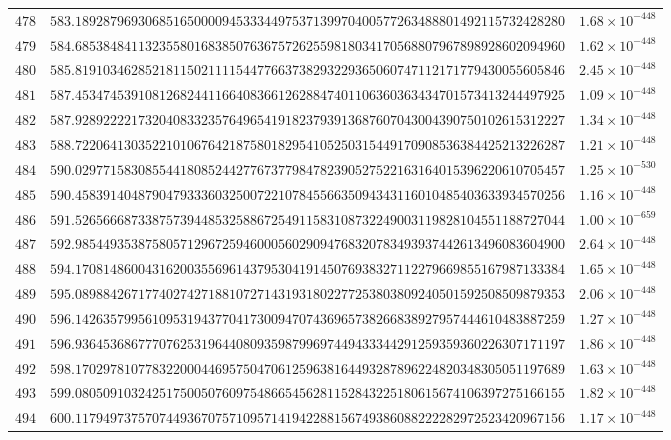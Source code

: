 \documentclass[12pt,reqno]{amsart}
\theoremstyle{remark}
\begin{document}
\begin{longtable}{clc}
$478$ & $583.1892879693068516500009453334497537139970400577263488801492115732428280$ & $1.68\times 10^{-448}$ \\
$479$ & $584.6853848411323558016838507636757262559818034170568807967898928602094960$ & $1.62\times 10^{-448}$ \\
$480$ & $585.8191034628521811502111154477663738293229365060747112171779430055605846$ & $2.45\times 10^{-448}$ \\
$481$ & $587.4534745391081268244116640836612628847401106360363434701573413244497925$ & $1.09\times 10^{-448}$ \\
$482$ & $587.9289222217320408332357649654191823793913687607043004390750102615312227$ & $1.34\times 10^{-448}$ \\
$483$ & $588.7220641303522101067642187580182954105250315449170908536384425213226287$ & $1.21\times 10^{-448}$ \\
$484$ & $590.0297715830855441808524427767377984782390527522163164015396220610705457$ & $1.25\times 10^{-530}$ \\
$485$ & $590.4583914048790479333603250072210784556635094343116010485403633934570256$ & $1.16\times 10^{-448}$ \\
$486$ & $591.5265666873387573944853258867254911583108732249003119828104551188727044$ & $1.00\times 10^{-659}$ \\
$487$ & $592.9854493538758057129672594600056029094768320783493937442613496083604900$ & $2.64\times 10^{-448}$ \\
$488$ & $594.1708148600431620035569614379530419145076938327112279669855167987133384$ & $1.65\times 10^{-448}$ \\
$489$ & $595.0898842671774027427188107271431931802277253803809240501592508509879353$ & $2.06\times 10^{-448}$ \\
$490$ & $596.1426357995610953194377041730094707436965738266838927957444610483887259$ & $1.27\times 10^{-448}$ \\
$491$ & $596.9364536867770762531964408093598799697449433344291259359360226307171197$ & $1.86\times 10^{-448}$ \\
$492$ & $598.1702978107783220004469575047061259638164493287896224820348305051197689$ & $1.63\times 10^{-448}$ \\
$493$ & $599.0805091032425175005076097548665456281152843225180615674106397275166155$ & $1.82\times 10^{-448}$ \\
$494$ & $600.1179497375707449367075710957141942288156749386088222282972523420967156$ & $1.17\times 10^{-448}$ \\

\end{longtable}
\end{document}
